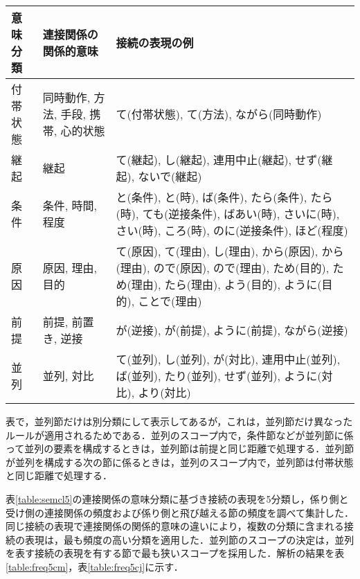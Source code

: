 \begin{table*}
\caption{連接関係の意味分類}
\label{table:semcl5}
\begin{tabular}{|p{}|p{}| p{}|}
\hline
\multicolumn{1}{|p{5zw}|}{意味分類} & \multicolumn{1}{|p{12zw}|}{連接関係の関係的意味} & \multicolumn{1}{|p{20zw}|}{接続の表現の例}\\
\hline
付帯状態 & 同時動作, 方法, 手段, 携帯, 心的状態 & て(付帯状態), て(方法), ながら(同時動作) \\
継起 & 継起 & て(継起), し(継起), 連用中止(継起), せず(継起), ないで(継起) \\
条件 & 条件, 時間, 程度 & と(条件), と(時), ば(条件), たら(条件), たら(時), ても(逆接条件), ばあい(時), さいに(時), さい(時), ころ(時), のに(逆接条件), ほど(程度) \\
原因 & 原因, 理由, 目的 & て(原因), て(理由), し(理由), から(原因), から(理由), ので(原因), ので(理由), ため(目的), ため(理由), たら(理由), よう(目的), ように(目的), ことで(理由)\\
前提 & 前提, 前置き, 逆接 & が(逆接), が(前提), ように(前提), ながら(逆接)\\
\hline
並列 & 並列, 対比 & て(並列), し(並列), が(対比),  連用中止(並列), ば(並列), たり(並列), せず(並列), ように(対比), より(対比) \\
\hline
\end{tabular}
\end{table*}

表で，並列節だけは別分類にして表示してあるが，これは，並列節だけ異なったルールが適用されるためである．並列のスコープ内で，条件節などが並列節に係って並列の要素を構成するときは，並列節は前提と同じ距離で処理する．並列節が並列を構成する次の節に係るときは，並列のスコープ内で，並列節は付帯状態と同じ距離で処理する．

表\ref{table:semcl5}の連接関係の意味分類に基づき接続の表現を5分類し，係り側と受け側の連接関係の頻度および係り側と飛び越える節の頻度を調べて集計した．同じ接続の表現で連接関係の関係的意味の違いにより，複数の分類に含まれる接続の表現は，最も頻度の高い分類を適用した．並列節のスコープの決定は，並列を表す接続の表現を有する節で最も狭いスコープを採用した．解析の結果を表\ref{table:freq5cm}，表\ref{table:freq5cj}に示す．

